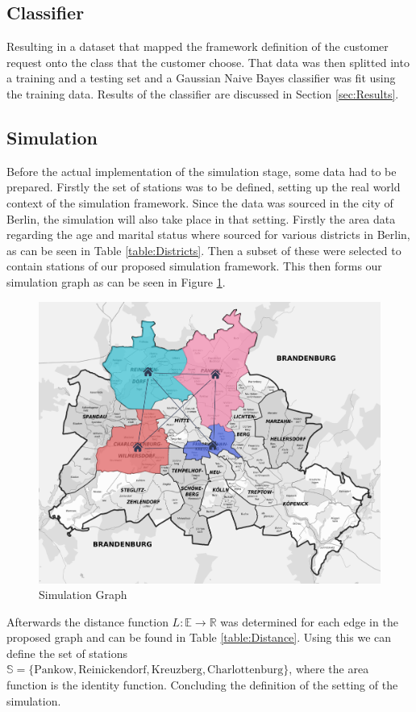 \subsection{Classifier}
\label{sub_sec:CaseStudy/Classifier}

Resulting in a dataset that mapped the framework definition of the customer request onto the class that the customer choose.
That data was then splitted into a training and a testing set and a Gaussian Naive Bayes classifier was fit using
the training data. Results of the classifier are discussed in Section \ref{sec:Results}.


\subsection{Simulation}
\label{sub_sec:CaseStudy/Simulation}

Before the actual implementation of the simulation stage, some data had to be prepared. Firstly 
the set of stations was to be defined, setting up the real world context of the simulation 
framework. Since the data was sourced in the city of Berlin, the simulation will also take place
in that setting. Firstly the area data regarding the age and marital status where sourced for various
districts in Berlin, as can be seen in Table \ref{table:Districts}. Then a subset of these were selected
to contain stations of our proposed simulation framework. This then forms our simulation graph as can be
seen in Figure \ref{fig:Graph}.
\begin{figure}[htbp]
  \centering
  \includegraphics[width=.5\linewidth]{./Figures/graph.png}
  \caption{Simulation Graph}
  \label{fig:Graph}
\end{figure}

Afterwards the distance function $L: \mathbb{E} \to \mathbb{R}$ was determined for each edge in the proposed graph and can be found
in Table \ref{table:Distance}. Using this we can define the set of stations $\mathbb{S} = \{ \text{Pankow}, \text{Reinickendorf}, \text{Kreuzberg}, \text{Charlottenburg} \}$,
where the area function is the identity function. Concluding the definition of the setting of the simulation.


